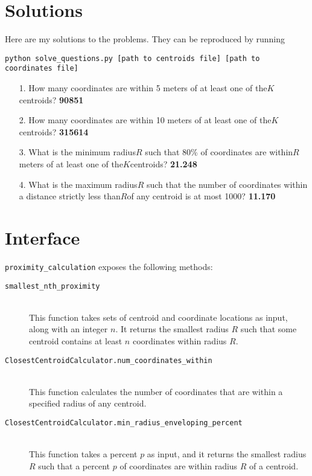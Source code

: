 \documentclass{amsart}
\theoremstyle{definition}
\theoremstyle{definition}
\begin{document}
\section{Solutions}
Here are my solutions to the problems.  They can be reproduced by running
\begin{center}
  \texttt{python solve\_questions.py [path to centroids file] [path to coordinates file]}
\end{center}
\begin{itemize}
  \item[1.] How many coordinates are within 5 meters of at least one of the ​$K$ ​centroids? \textbf{90851}
  \item[2.] How many coordinates are within 10 meters of at least one of the ​$K$ ​centroids? \textbf{315614}
  \item[3.] What is the minimum radius ​$R$ such that 80\% of coordinates are within ​$R$ ​meters of at least one of the ​$K$ ​centroids? \textbf{21.248}
  \item[4.] What is the maximum radius ​$R$ such that the number of coordinates within a distance strictly less than ​$R$ ​of any centroid is at most 1000? \textbf{11.170}
\end{itemize}

\section{Interface}
\texttt{proximity\_calculation} exposes the following methods:
\begin{description}
\item[\texttt{smallest\_nth\_proximity}]\ \\
  This function takes sets of centroid and coordinate locations as input, along with an integer $n$.  It returns the smallest radius $R$ such that some centroid contains at least $n$ coordinates within radius $R$.
\item[\texttt{ClosestCentroidCalculator.num\_coordinates\_within}]\ \\
  This function calculates the number of coordinates that are within a specified radius of any centroid.
\item[\texttt{ClosestCentroidCalculator.min\_radius\_enveloping\_percent}]\ \\
  This function takes a percent $p$ as input, and it returns the smallest radius $R$ such that a percent $p$ of coordinates are within radius $R$ of a centroid.
\end{description}
\end{document}
